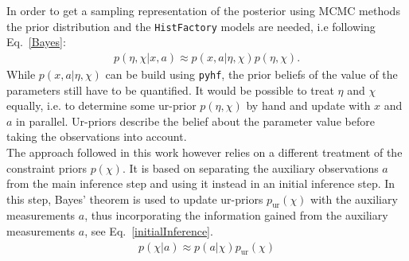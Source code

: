 In order to get a sampling representation of the posterior using MCMC methods the prior distribution and the \texttt{HistFactory} models are needed, i.e following Eq.~\eqref{Bayes}:
    \begin{align}
        p(\eta, \chi \vert x, a) \approx p(x, a \vert \eta, \chi)p(\eta, \chi).
    \end{align}
\noindent While $p(x, a \vert \eta, \chi)$ can be build using \texttt{pyhf}, the prior beliefs of the value of the parameters still have to be quantified. It would be possible to treat $\eta$ and $\chi$ equally, i.e. to determine some ur-prior $p(\eta, \chi)$ by hand and update with $x$ and $a$ in parallel. Ur-priors describe the belief about the parameter value before taking the observations into account. \\
The approach followed in this work however relies on a different treatment of the constraint priors $p(\chi)$. It is based on separating the auxiliary observations $a$ from the main inference step and using it instead in an initial inference step. In this step, Bayes' theorem is used to update ur-priors $p_\text{ur}(\chi)$ with the auxiliary measurements $a$, thus incorporating the information gained from the auxiliary measurements $a$, see Eq.~\eqref{initialInference}.
    \begin{align} \label{initialInference}
	p(\chi \vert a) \approx p(a \vert \chi) p_{\text{ur}}(\chi)
    \end{align}


